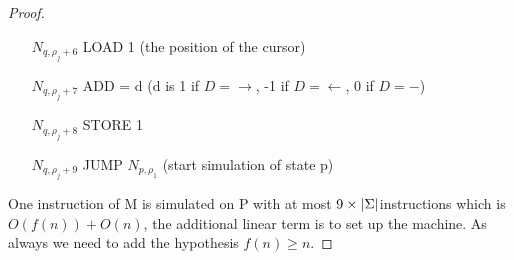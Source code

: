 \begin{theorem}
\begin{proof}
\begin{enumerate}
            \item[$N_{q,\rho_j+6}$] LOAD 1 \quad (the position of the cursor)
            \item[$N_{q,\rho_j+7}$] ADD = d \quad (d is 1 if $D=\rightarrow$, -1 if $D=\leftarrow$, 0 if $D=-$)
            \item[$N_{q,\rho_j+8}$] STORE 1
            \item[$N_{q,\rho_j+9}$] JUMP $N_{p,\rho_1}$ \quad (start simulation of state p)
        \end{enumerate}
        One instruction of M is simulated on P with at most $9 \times \left\lvert\Sigma\right\rvert $instructions which is $O(f(n)) + O(n)$, the additional linear term is to set up the machine. As always we need to add the hypothesis $f(n) \geq n$.
    \end{proof}
\end{theorem}
